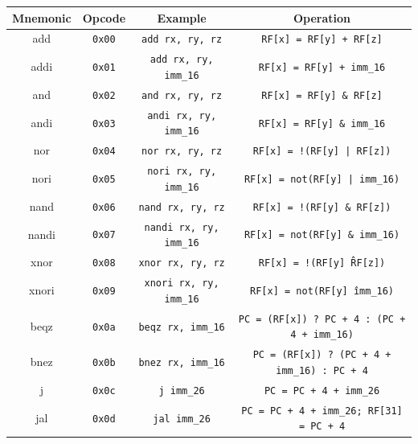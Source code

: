 \begin{table}[]
    \centering
    \begin{tabular}{|c|c|c|c|}
        \hline
         Mnemonic & Opcode & Example & Operation \\
         \hline

add & \texttt{0x00} & \texttt{add rx, ry, rz} & \texttt{RF[x] = RF[y] + RF[z]} \\

addi & \texttt{0x01} & \texttt{add rx, ry, imm\_16} & \texttt{RF[x] = RF[y] + imm\_16} \\

and & \texttt{0x02} & \texttt{and rx, ry, rz} & \texttt{RF[x] = RF[y] \& RF[z]} \\

andi & \texttt{0x03} & \texttt{andi rx, ry, imm\_16} & \texttt{RF[x] = RF[y] \& imm\_16} \\

nor & \texttt{0x04} & \texttt{nor rx, ry, rz} & \texttt{RF[x] = !(RF[y] | RF[z])} \\

nori & \texttt{0x05} & \texttt{nori rx, ry, imm\_16} & \texttt{RF[x] = not(RF[y] | imm\_16)} \\

nand  & \texttt{0x06} & \texttt{nand rx, ry, rz} & \texttt{RF[x] = !(RF[y] \& RF[z])} \\

nandi & \texttt{0x07} & \texttt{nandi rx, ry, imm\_16} & \texttt{RF[x] = not(RF[y] \& imm\_16)} \\

xnor & \texttt{0x08} & \texttt{xnor rx, ry, rz} & \texttt{RF[x] = !(RF[y] \^ RF[z])} \\

xnori & \texttt{0x09} & \texttt{xnori rx, ry, imm\_16} & \texttt{RF[x] = not(RF[y] \^ imm\_16)} \\

beqz & \texttt{0x0a} & \texttt{beqz rx, imm\_16} & \texttt{PC = (RF[x]) ? PC + 4 : (PC + 4 + imm\_16)} \\

bnez & \texttt{0x0b} & \texttt{bnez rx, imm\_16} & \texttt{PC = (RF[x]) ? (PC + 4 + imm\_16) : PC + 4} \\

j & \texttt{0x0c} & \texttt{j imm\_26} & \texttt{PC = PC + 4 + imm\_26} \\

jal & \texttt{0x0d} & \texttt{jal imm\_26} &\texttt{PC = PC + 4 + imm\_26; RF[31] = PC + 4} \\


\end{tabular}
\end{table}
